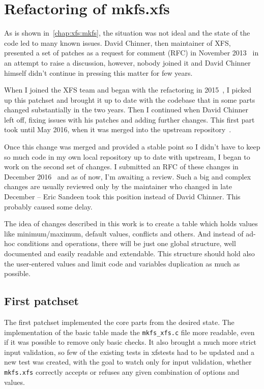 \chapter{Refactoring of mkfs.xfs} \label{chap:refactoring}
As is shown in~\ref{chap:xfs:mkfs}, the situation was not ideal and the state of the code led to many known issues. David Chinner, then maintainer of XFS, presented a set of patches as a request for comment (RFC) in November 2013~\cite{davidsPatches} in an attempt to raise a discussion, however, nobody joined it and David Chinner himself didn't continue in pressing this matter for few years.

When I joined the XFS team and began with the refactoring in 2015~\cite{myFirstPatches}, I picked up this patchset and brought it up to date with the codebase that in some parts changed substantially in the two years. Then I continued when David Chinner left off, fixing issues with his patches and adding further changes. This first part took until May 2016, when it was merged into the upstream repository~\cite{finalPatchset1,finalPatchset1Announce}.

Once this change was merged and provided a stable point so I didn't have to keep so much code in my own local repository up to date with upstream, I began to work on the second set of changes. I submitted an RFC of these changes in December 2016~\cite{secondSetRFC} and as of now, I'm awaiting a review. Such a big and complex changes are usually reviewed only by the maintainer who changed in late December -- Eric Sandeen took this position instead of David Chinner. This probably caused some delay.

The idea of changes described in this work is to create a table which holds values like minimum/maximum, default values, conflicts and others. And instead of ad-hoc conditions and operations, there will be just one global structure, well documented and easily readable and extendable. This structure should hold also the user-entered values and limit code and variables duplication as much as possible.

\section{First patchset}\label{chap:refactoring:first}
The first patchset implemented the core parts from the desired state. The implementation of the basic table made the {\tt mkfs\_xfs.c} file more readable, even if it was possible to remove only basic checks. It also brought a much more strict input validation, so few of the existing tests in xfstests had to be updated and a new test was created, with the goal to watch only for input validation, whether {\tt mkfs.xfs} correctly accepts or refuses any given combination of options and values.

